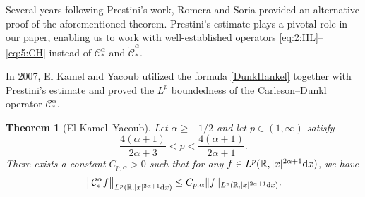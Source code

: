 \documentclass[11pt,oneside]{amsart}
\numberwithin{equation}{section}
\newtheorem{theorem}[equation]{Theorem}
\theoremstyle{definition}
\newcommand{\RR}{\mathbb{R}}
\newcommand{\calC}{\mathcal{C}}
\begin{document}
Several years following Prestini's work, Romera and Soria \cite{RomeraSoria91} provided an alternative proof of the aforementioned theorem. Prestini's estimate plays a pivotal role in our paper, enabling us to work with well-established operators \eqref{eq:2:HL}--\eqref{eq:5:CH} instead of $\calC_{\ast}^\alpha$ and $\widetilde{\calC}_{\ast}^\alpha$.

In 2007, El Kamel and Yacoub \cite{EKY} utilized the formula \eqref{DunkHankel} together with Prestini's estimate and proved the $L^p$ boundedness of the Carleson--Dunkl operator $\calC_{\ast}^\alpha$.
\begin{theorem}[El Kamel--Yacoub]
Let $\alpha\geq-1/2$ and let $p\in(1,\infty)$ satisfy
 \begin{equation}
     \frac{4(\alpha+1)}{2\alpha+3}<p<\frac{4(\alpha+1)}{2\alpha+1}.
 \end{equation}
There exists a constant $C_{p,\alpha}>0$ such that for any $f\in L^p(\mathbb{R},|x|^{2\alpha+1}{\rm d}x)$, we have
\begin{equation}
    \big\|\calC_{\ast}^\alpha f\big\|_{L^p(\RR,|x|^{2\alpha+1}{\rm d}x)}\leq C_{p,\alpha}\|f\|_{L^p(\RR,|x|^{2\alpha+1}{\rm d}x)}.
\end{equation}
\end{theorem}
\end{document}
